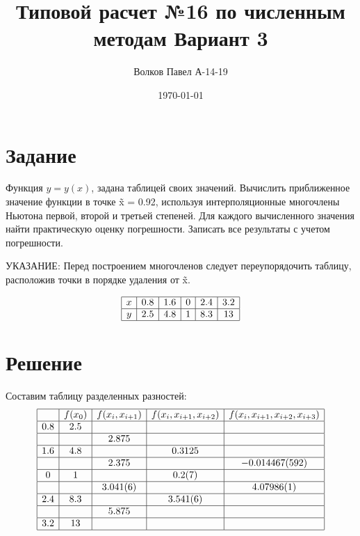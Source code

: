 \documentclass[a4paper,12pt]{report} %
\author{Волков Павел А-14-19}
\title{Типовой расчет №16 по численным методам Вариант 3}
\date{\today}
\begin{document}

\maketitle

\newpage
\section*{Задание}

Функция $y = y(x)$, задана таблицей своих значений. Вычислить приближенное значение функции в точке \~ x = 0.92, используя интерполяционные многочлены Ньютона первой, второй и третьей степеней. Для каждого вычисленного значения найти практическую оценку погрешности. Записать все результаты с учетом погрешности.

УКАЗАНИЕ: Перед построением многочленов следует переупорядочить таблицу, расположив точки в порядке удаления от \~ x.

\[
\begin{array}{| c | c | c | c | c | c |}
	\hline
	x & 0.8 & 1.6 & 0 & 2.4 & 3.2  \\ \hline
	y & 2.5 & 4.8 & 1 & 8.3 & 13  \\ \hline
\end{array}
\]

\section*{Решение}

Составим таблицу разделенных разностей:
\[
\begin{array}{| c | c | c | c | c |}
	\hline
	     & f(x_0) & f(x_i, x_{i+1}) & f(x_i, x_{i+1}, x_{i+2}) & f(x_i, x_{i+1}, x_{i+2}, x_{i+3})  \\ \hline
	0.8 &    2.5  &                      &                                     & \\ \hline
	     &           &  2.875            &                                     & \\ \hline
	1.6 &   4.8   &                      &  0.3125                         & \\ \hline
	      &          &  2.375            &                                     &  -0.014467(592) \\ \hline
	0    &    1    &                       &  0.2(7)                          & \\ \hline
	      &          &  3.041(6)        &                                     &  4.07986(1) \\ \hline
	2.4 &   8.3  &                       &   3.541(6)                    &\\ \hline
	      &         &  5.875             &                                     & \\ \hline
	3.2 &   13   &                       &                                     &\\ \hline
\end{array}
\]
\end{document}
